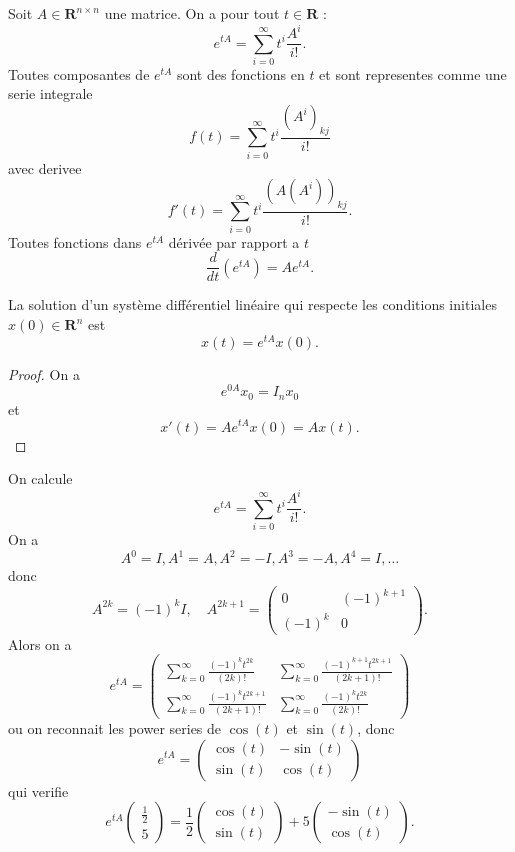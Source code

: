 Soit $A\in \mathbf{R}^{n\times n}$ une matrice. On a pour tout $t\in \mathbf{R}$ :
$$
e^{ tA }=\sum_{i=0}^{\infty} t^{i} \frac{A^{i}}{i!}.
$$
Toutes composantes de $e^{ tA }$ sont des fonctions en $t$ et sont representes comme une serie integrale
$$
f(t)=\sum_{i=0}^{\infty} t^{i} \frac{(A^{i})_{kj}}{i!} 
$$
avec derivee
$$
f'(t)=\sum_{i=0}^{\infty} t^{i}  \frac{(A(A^{i}))_{kj}}{i!}.  
$$
Toutes fonctions dans $e^{ tA }$ dérivée par rapport a $t$
$$
\frac{d}{dt}(e^{ tA })=Ae^{ tA }.
$$
\begin{theorem}
La solution d'un système différentiel linéaire qui respecte les conditions initiales $x(0)\in \mathbf{R}^{n}$ est 
$$
x(t)=e^{ tA }x(0).
$$
\end{theorem}
\begin{proof}
On a 
$$
e^{0A}x_{0}=I_{n}x_{0}
$$
et 
$$
x'(t)=Ae^{ tA }x(0)=Ax(t).
$$
\end{proof}
\begin{example}
On calcule
$$
e^{ tA }=\sum_{i=0}^{\infty}t^{i} \frac{A^{i}}{i!}. 
$$
On a 
$$
A^{0}=I, A^{1}=A, A^{2}=-I,A^{3}=-A,A^{4}=I,\dots
$$
donc
$$
A^{2k}=(-1)^{k}I,\quad A^{2k+1}=\begin{pmatrix}
0 & (-1)^{k+1} \\
(-1)^{k} & 0
\end{pmatrix}.
$$
Alors on a 
$$
e^{ tA }=\begin{pmatrix}
\sum_{k=0}^{\infty} \frac{(-1)^{k}t^{2k}}{(2k)!} & \sum_{k=0}^{\infty} \frac{(-1)^{k+1}t^{2k+1}}{(2k+1)!}  \\
\sum_{k=0}^{\infty} \frac{(-1)^{k}t^{2k+1}}{(2k+1)!} & \sum_{k=0}^{\infty}  \frac{(-1)^{k}t^{2k}}{(2k)!}
\end{pmatrix}
$$
ou on reconnait les power series de $\cos(t)$ et $\sin(t)$, donc
$$
e^{ tA }=\begin{pmatrix}
\cos(t) & -\sin(t) \\
\sin(t) & \cos(t)
\end{pmatrix}
$$
qui verifie
$$
e^{ tA }\begin{pmatrix}
\frac{1}{2} \\
5
\end{pmatrix}=\frac{1}{2}\begin{pmatrix}
\cos(t) \\
\sin(t)
\end{pmatrix}+5\begin{pmatrix}
-\sin (t) \\
\cos(t)
\end{pmatrix}.
$$
\end{example}
